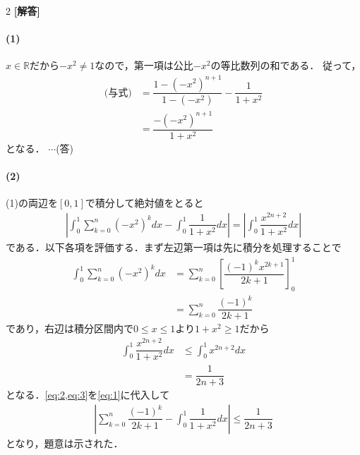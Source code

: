 \documentclass[../../main.tex]{subfiles}
\begin{document}
\setcounter{equation}{0}
\setcounter{figure}{0}
\setcounter{table}{0}
\begin{oframed}
  
\end{oframed}
\setlength{\columnseprule}{0.4pt}
\begin{multicols}{2}
  {\bf [解答]}

  \paragraph{(1)}
  $x \in \mathbb{R}$だから$-x^2 \neq 1$なので，第一項は公比$-x^2$の等比数列の和である．
  従って，
  \begin{align}
    \text{(与式)}
    & = \dfrac{1-(-x^2)^{n+1}}{1-(-x^2)} - \dfrac{1}{1+x^2} \\
    & = \dfrac{-(-x^2)^{n+1}}{1+x^2}
  \end{align}
  となる． $\cdots$(答)

  \paragraph{(2)}
  (1)の両辺を$[0,1]$で積分して絶対値をとると
  \begin{align}
    \left| \int_0^1 \sum_{k=0}^n (-x^2)^k dx - \int_0^1 \dfrac{1}{1+x^2} dx \right|
    = \left| \int_0^1 \dfrac{x^{2n+2}}{1+x^2} dx \right| \label{eq:1}
  \end{align}
  である．以下各項を評価する．まず左辺第一項は先に積分を処理することで
  \begin{align}
    \int_0^1 \sum_{k=0}^n (-x^2)^k dx
    & = \sum_{k=0}^n \left[ \dfrac{(-1)^k x^{2k+1}}{2k+1} \right]_0^1 \nonumber \\
    & = \sum_{k=0}^n \dfrac{(-1)^k}{2k+1} \label{eq:2}
  \end{align}
  であり，右辺は積分区間内で$0\le x\le 1$より$1+x^2\ge 1$だから
  \begin{align}
    \int_0^1 \dfrac{x^{2n+2}}{1+x^2} dx
    & \le \int_0^1 x^{2n+2} dx      \nonumber \\
    & = \dfrac{1}{2n+3} \label{eq:3}
  \end{align}
  となる．\cref{eq:2,eq:3}を\cref{eq:1}に代入して
  \begin{align}
    \left| \sum_{k=0}^n \dfrac{(-1)^k}{2k+1} - \int_0^1 \dfrac{1}{1+x^2} dx \right| \le \dfrac{1}{2n+3} \label{eq:4}
  \end{align}
  となり，題意は示された．


\end{multicols}
\end{document}
